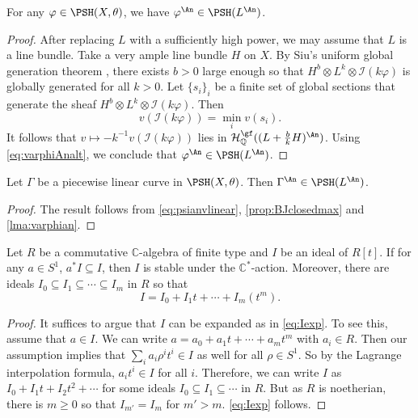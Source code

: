 \begin{lemma}\label{lma:varphian}
For any $\varphi\in \PSH(X,\theta)$, we have $\varphi^{\An}\in \PSH(L^{\An})$.
\end{lemma}
\begin{proof}
After replacing $L$ with a sufficiently high power, we may assume that $L$ is a line bundle. Take a very ample line bundle $H$ on $X$.
By Siu's uniform global generation theorem \cite{Siu98}, \cite[Theorem~6.27]{Dem12} there exists $b>0$ large enough so that $H^{b}\otimes L^k\otimes \mathcal{I}(k\varphi)$ is globally generated for all $k>0$. Let $\{s_i\}_i$ be a finite set of global sections that generate the sheaf $H^{b}\otimes L^k\otimes \mathcal{I}(k\varphi)$. Then
\[
v(\mathcal{I}(k\varphi))=\min_i v(s_i).
\]
It follows that $v\mapsto -k^{-1}v\left(\mathcal{I}(k\varphi) \right)$ lies in $\mathcal{H}^{\gf}_{\mathbb{Q}}((L+\frac{b}{k}H)^{\An})$. Using \eqref{eq:varphiAnalt}, we conclude that $\varphi^{\An}\in \PSH(L^{\An})$.
\end{proof}


\begin{lemma}\label{lma:pltest}
Let $\Gamma$ be a piecewise linear curve in $\PSH(X,\theta)$.
Then $\Gamma^{\An}\in \PSH(L^{\An})$.
\end{lemma}
\begin{proof}  The result follows from \eqref{eq:psianvlinear}, \cref{prop:BJclosedmax} and \cref{lma:varphian}.
\end{proof}

\begin{lemma}\label{lma:istab}
Let $R$ be a commutative $\mathbb{C}$-algebra of finite type and $I$ be an ideal of $ R[t]$. If for any $a\in S^1$, $a^*I\subseteq I$, then $I$ is stable under the $\mathbb C^*$-action. Moreover, there are ideals $I_0\subseteq I_1\subseteq \cdots \subseteq I_m$ in $R$ so that
\begin{equation}\label{eq:Iexp}
    I=I_0 + I_1t+ \cdots + I_m (t^m).
    \end{equation}
\end{lemma}

\begin{proof}
It suffices to argue that $I$ can be expanded as in \eqref{eq:Iexp}.
To see this, assume that $a\in I$. We can write $a=a_0+a_1t+\cdots+a_mt^m$ with $a_i\in R$. Then our assumption implies that $\sum_i a_i \rho^i t^i\in I$ as well for all $\rho\in S^1$. So by the Lagrange interpolation formula, $a_it^i\in I$ for all $i$. Therefore, we can write $I$ as $I_0+I_1t+I_2t^2+\cdots$ for some ideals $I_0\subseteq I_1\subseteq \cdots$ in $R$. But as $R$ is noetherian, there is $m\geq 0$ so that $I_{m'}=I_m$ for $m'>m$. \eqref{eq:Iexp} follows.
\end{proof}

